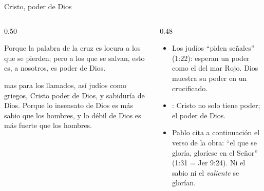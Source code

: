 \begin{frame}{Cristo, poder de Dios}
\begin{columns}[t,onlytextwidth]
\begin{column}{0.50\textwidth}
\begin{cita}Porque la palabra de la cruz es locura a los que se pierden; pero a los que se salvan, esto es, a nosotros, es poder de Dios.\end{cita}
\begin{cita}mas para los llamados, así judíos como griegos, Cristo poder de Dios, y sabiduría de Dios. Porque lo insensato de Dios es más sabio que los hombres, y lo débil de Dios es más fuerte que los hombres.\end{cita}
\end{column}
\begin{column}{0.48\textwidth}\small
\begin{itemize}
\item Los judíos ``piden señales'' (1:22): esperan un poder como el del mar Rojo. Dios muestra su poder en un crucificado.
\item {}: Cristo no solo tiene poder;  el poder de Dios.
\item Pablo cita a continuación el verso de la obra: ``el que se gloría, gloríese en el Señor'' (1:31 = Jer 9:24). Ni el sabio ni el \emph{valiente} se glorían.
\end{itemize}
\end{column}
\end{columns}
\end{frame}


